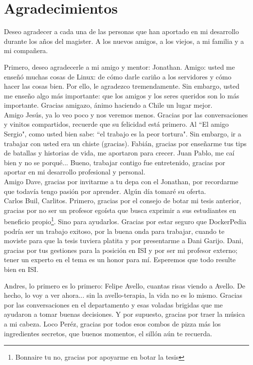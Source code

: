 
\section*{Agradecimientos}

Deseo agradecer a cada una de las personas que han aportado en mi desarrollo durante los años del magister. A los nuevos amigos, a los viejos, a mi familia y a mi compañera.

Primero, deseo agradecerle a mi amigo y mentor: Jonathan. Amigo: usted me enseñó muchas cosas de Linux: de cómo darle cariño a los servidores y cómo hacer las cosas bien. 
Por ello, le agradezco tremendamente. 
Sin embargo, usted me enseño algo más importante: que los amigos y los seres queridos son lo más importante. Gracias amigazo, ánimo haciendo a Chile un lugar mejor.\\
Amigo Jesús, ya lo veo poco y nos veremos menos. Gracias por las conversaciones y vinitos compartidos, recuerde que su felicidad está primero.
Al ``El amigo Sergio", como usted bien sabe: ``el trabajo es la peor tortura". Sin embargo, ir a trabajar con usted era un chiste (gracias). 
Fabián, gracias por enseñarme tus tips de batallas y historias de vida, me aportaron para crecer. 
Juan Pablo, me caí bien y no se porqué... Bueno, trabajar contigo fue entretenido, gracias por aportar en mi desarrollo profesional y personal.\\
Amigo Dave, gracias por invitarme a tu depa con el Jonathan, por recordarme que todavía tengo pasión por aprender. Algún día tomaré su oferta.\\
Carlos Buil, Carlitos. Primero, gracias por el consejo de botar mi tesis anterior, gracias por no ser un profesor egoísta que busca exprimir a sus estudiantes en beneficio propio\footnote{Bonnaire tu no, gracias por apoyarme en botar la tesis}. Sino para ayudarlos. Gracias por estar seguro que DockerPedia podría ser un trabajo exitoso, por la buena onda para trabajar, cuando te moviste para que la tesis tuviera platita y por presentarme a Dani Garijo.
Dani, gracias por tus gestiones para la posición en ISI y por ser mi profesor externo; tener un experto en el tema es un honor para mí. Esperemos que todo resulte bien en ISI.

Andres, lo primero es lo primero: Felipe Avello, cuantas risas viendo a Avello. De hecho, lo voy a ver ahora... sin la avello-terapia, la vida no es lo mismo. Gracias por las conversaciones en el departamento y esas voladas brigidas que me ayudaron a tomar buenas decisiones. Y por supuesto, gracias por traer la música a mi cabeza.
Loco Peréz, gracias por todos esos combos de pizza más los ingredientes secretos, que buenos momentos, el sillón aún te recuerda.

